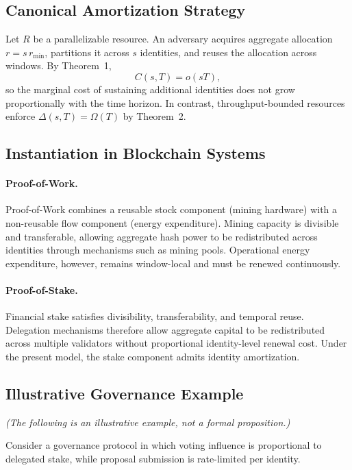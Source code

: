 \documentclass[journal]{IEEEtran}
\begin{document}
	\subsection{Canonical Amortization Strategy}
	
	Let $R$ be a parallelizable resource.
	An adversary acquires aggregate allocation
	$r = s\,r_{\min}$, partitions it across $s$ identities,
	and reuses the allocation across windows.
	By Theorem~1,
	\[
	C(s,T)=o(sT),
	\]
	so the marginal cost of sustaining additional identities does
	not grow proportionally with the time horizon.
	In contrast, throughput-bounded resources enforce
	$\Delta(s,T)=\Omega(T)$ by Theorem~2.
	
	\subsection{Instantiation in Blockchain Systems}
	
	\paragraph{Proof-of-Work.}
	Proof-of-Work combines a reusable stock component
	(mining hardware) with a non-reusable flow component
	(energy expenditure).
	Mining capacity is divisible and transferable, allowing
	aggregate hash power to be redistributed across identities
	through mechanisms such as mining pools.
	Operational energy expenditure, however, remains
	window-local and must be renewed continuously.
	
	\paragraph{Proof-of-Stake.}
	Financial stake satisfies divisibility, transferability,
	and temporal reuse.
	Delegation mechanisms therefore allow aggregate capital
	to be redistributed across multiple validators without
	proportional identity-level renewal cost.
	Under the present model, the stake component admits
	identity amortization.
	
	\subsection{Illustrative Governance Example}
	\label{sec:governance_example}
	
	\noindent\textit{(The following is an illustrative example,
		not a formal proposition.)}
	
	\medskip
	Consider a governance protocol in which voting influence
	is proportional to delegated stake, while proposal submission
	is rate-limited per identity.
	
\end{document}
